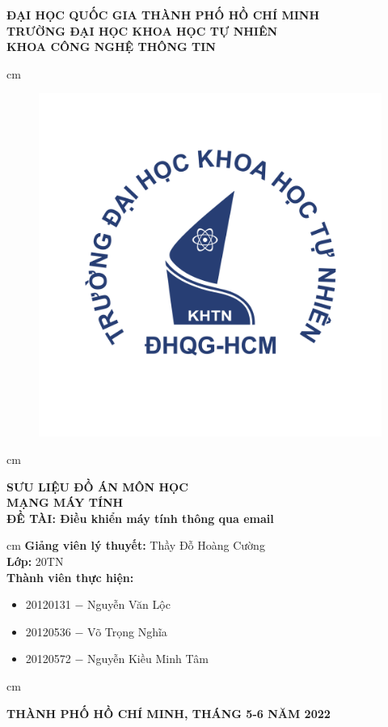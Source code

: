 \begin{titlepage}
\begin{mybox}
\begin{center}
\fontsize{12}{12}\selectfont
\textbf{ĐẠI HỌC QUỐC GIA THÀNH PHỐ HỒ CHÍ MINH}\\
\textbf{TRƯỜNG ĐẠI HỌC KHOA HỌC TỰ NHIÊN}\\
\textbf{KHOA CÔNG NGHỆ THÔNG TIN}
\end{center}
 cm
\begin{figure}[H]
\begin{center}
\includegraphics[scale=0.25]{figures/logo}
\end{center}
\end{figure}
 cm
\begin{center}
\fontsize{18}{14}\selectfont
\textbf{SƯU LIỆU ĐỒ ÁN MÔN HỌC}\\
\fontsize{26}{16}\selectfont
\textbf{MẠNG MÁY TÍNH}\\
\fontsize{18}{12}\selectfont
\textbf{ĐỀ TÀI: Điều khiển máy tính thông qua email}
\end{center}
 cm
\fontsize{14}{12}\selectfont
\textbf{Giảng viên lý thuyết:} Thầy Đỗ Hoàng Cường\\
\textbf{Lớp:} 20TN\\
\textbf{Thành viên thực hiện:}
\begin{itemize}
\item 20120131 $-$ Nguyễn Văn Lộc
\item 20120536 $-$ Võ Trọng Nghĩa
\item 20120572 $-$ Nguyễn Kiều Minh Tâm
\end{itemize}
 cm
\begin{center}
\textbf{THÀNH PHỐ HỒ CHÍ MINH, THÁNG 5-6 NĂM 2022}
\end{center}
\end{mybox}
\end{titlepage}